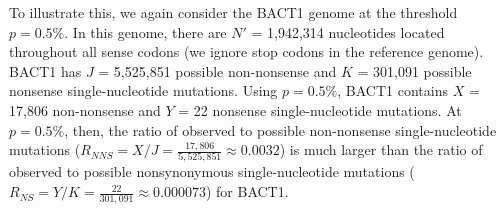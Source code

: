 To illustrate this, we again consider
the BACT1 genome at the threshold $p = 0.5\%$.
%
In this genome, there are $N'$ = 1,942,314 nucleotides
located throughout all sense codons (we ignore stop codons in the reference genome).
%
BACT1 has $J$ = 5,525,851 possible non-nonsense and
$K$ = 301,091 possible nonsense single-nucleotide mutations.
%
Using $p = 0.5\%$, BACT1 contains
$X$ = 17,806 non-nonsense and
$Y$ = 22 nonsense single-nucleotide mutations.
%
At $p = 0.5\%$, then, the ratio of observed to possible non-nonsense single-nucleotide mutations
($R_{NNS} = X / J = \frac{17,806}{5,525,851}
\approx 0.0032$)
is much larger than the ratio of observed to possible nonsynonymous single-nucleotide mutations
($R_{NS} = Y / K = \frac{22}{301,091}
\approx 0.000073$)
for BACT1.
\endinput